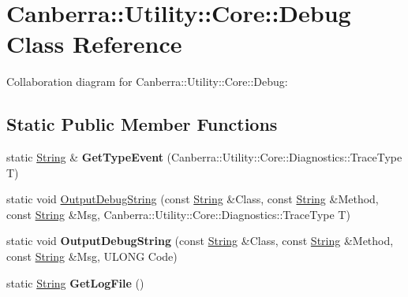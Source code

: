 \hypertarget{class_canberra_1_1_utility_1_1_core_1_1_debug}{}\section{Canberra\+:\+:Utility\+:\+:Core\+:\+:Debug Class Reference}
\label{class_canberra_1_1_utility_1_1_core_1_1_debug}


Collaboration diagram for Canberra\+:\+:Utility\+:\+:Core\+:\+:Debug\+:
\subsection*{Static Public Member Functions}
\begin{DoxyCompactItemize}
\item 
\mbox{\label{class_canberra_1_1_utility_1_1_core_1_1_debug_a883ce3b5b7e0cd276de0ed1bebbd5268}} 
static \hyperlink{class_canberra_1_1_utility_1_1_core_1_1_string}{String} \& {\bfseries Get\+Type\+Event} (Canberra\+::\+Utility\+::\+Core\+::\+Diagnostics\+::\+Trace\+Type T)
\item 
static void \hyperlink{class_canberra_1_1_utility_1_1_core_1_1_debug_a727e78e36d872ec57a1451d3ff80782d_a727e78e36d872ec57a1451d3ff80782d}{Output\+Debug\+String} (const \hyperlink{class_canberra_1_1_utility_1_1_core_1_1_string}{String} \&Class, const \hyperlink{class_canberra_1_1_utility_1_1_core_1_1_string}{String} \&Method, const \hyperlink{class_canberra_1_1_utility_1_1_core_1_1_string}{String} \&Msg, Canberra\+::\+Utility\+::\+Core\+::\+Diagnostics\+::\+Trace\+Type T)
\item 
\mbox{\label{class_canberra_1_1_utility_1_1_core_1_1_debug_abb39a4e7566683582004486d8a28c9c6}} 
static void {\bfseries Output\+Debug\+String} (const \hyperlink{class_canberra_1_1_utility_1_1_core_1_1_string}{String} \&Class, const \hyperlink{class_canberra_1_1_utility_1_1_core_1_1_string}{String} \&Method, const \hyperlink{class_canberra_1_1_utility_1_1_core_1_1_string}{String} \&Msg, U\+L\+O\+NG Code)
\item 
\mbox{\label{class_canberra_1_1_utility_1_1_core_1_1_debug_a8b014e7ded6d7c35b206cbfe998470fe}} 
static \hyperlink{class_canberra_1_1_utility_1_1_core_1_1_string}{String} {\bfseries Get\+Log\+File} ()

\end{DoxyCompactItemize}
